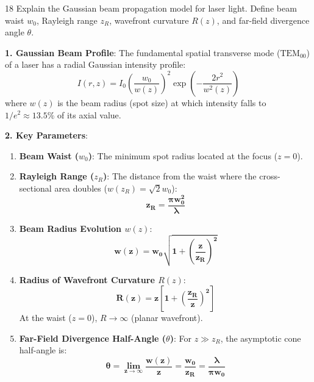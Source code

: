 \begin{theoryq}{18}
Explain the Gaussian beam propagation model for laser light. Define beam waist $w_0$, Rayleigh range $z_R$, wavefront curvature $R(z)$, and far-field divergence angle $\theta$.
\end{theoryq}
\begin{theorysol}
\textbf{1. Gaussian Beam Profile}:
The fundamental spatial transverse mode ($\text{TEM}_{00}$) of a laser has a radial Gaussian intensity profile:
\begin{equation}
I(r, z) = I_0 \left(\frac{w_0}{w(z)}\right)^2 \exp\left(-\frac{2r^2}{w^2(z)}\right)
\end{equation}
where $w(z)$ is the beam radius (spot size) at which intensity falls to $1/e^2 \approx 13.5\%$ of its axial value.

\textbf{2. Key Parameters}:
\begin{enumerate}
    \item \textbf{Beam Waist ($w_0$)}: The minimum spot radius located at the focus ($z = 0$).
    \item \textbf{Rayleigh Range ($z_R$)}: The distance from the waist where the cross-sectional area doubles ($w(z_R) = \sqrt{2}w_0$):
    \begin{equation}
    \mathbf{z_R = \frac{\pi w_0^2}{\lambda}}
    \end{equation}
    \item \textbf{Beam Radius Evolution $w(z)$}:
    \begin{equation}
    \mathbf{w(z) = w_0 \sqrt{1 + \left(\frac{z}{z_R}\right)^2}}
    \end{equation}
    \item \textbf{Radius of Wavefront Curvature $R(z)$}:
    \begin{equation}
    \mathbf{R(z) = z \left[ 1 + \left(\frac{z_R}{z}\right)^2 \right]}
    \end{equation}
    At the waist ($z=0$), $R \to \infty$ (planar wavefront).
    \item \textbf{Far-Field Divergence Half-Angle ($\theta$)}:
    For $z \gg z_R$, the asymptotic cone half-angle is:
    \begin{equation}
    \mathbf{\theta = \lim_{z\to\infty}\frac{w(z)}{z} = \frac{w_0}{z_R} = \frac{\lambda}{\pi w_0}}
    \end{equation}
\end{enumerate}
\end{theorysol}
\vspace{4mm}

